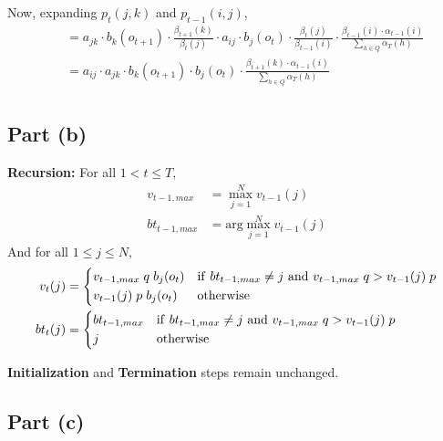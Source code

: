 \documentclass[11pt,a4paper,titlepage]{article}
\begin{document}
Now, expanding $p_t(j, k)$ and $p_{t-1}(i, j)$,
\begin{align*}
    ~~ &= a_{jk} \cdot b_k(o_{t+1}) \cdot \frac{\beta_{t+1}(k)}{\beta_t(j)} \cdot
          a_{ij} \cdot b_j(o_t) \cdot \frac{\beta_t(j)}{\beta_{t-1}(i)} \cdot
          \frac{\beta_{t-1}(i) \cdot \alpha_{t-1}(i)}{\sum_{h \in Q}\alpha_T(h)} \\
       &= a_{ij} \cdot a_{jk} \cdot b_k(o_{t+1}) \cdot b_j(o_t) \cdot
          \frac{\beta_{t+1}(k) \cdot \alpha_{t-1}(i)}{\sum_{h \in Q}\alpha_T(h)} \\
\end{align*}

\subsection*{Part (b)}

\textbf{Recursion:} For all $1 < t \le T$,
\begin{align*}
    v_{t-1, max} &= \max_{j=1}^N v_{t-1}(j) \\
    bt_{t-1, max} &= \textrm{arg}\max_{j=1}^N v_{t-1}(j) %
\end{align*}
And for all $1 \le j \le N$,
\begin{align*}
    v_t(j) &=
    \begin{dcases}
        v_{t-1, max} \; q \; b_j(o_t)
            & {\rm if~} bt_{t-1, max} \ne j {\rm~and~} v_{t-1, max} \; q > v_{t-1}(j) \; p \\
        v_{t-1}(j) \; p \; b_j(o_t)
            & \textrm{otherwise}
    \end{dcases} \\
    bt_t(j) &=
    \begin{dcases}
        bt_{t-1,max}
            & {\rm if~} bt_{t-1, max} \ne j {\rm~and~} v_{t-1, max} \; q > v_{t-1}(j) \; p \\
        j
            & \textrm{otherwise}
    \end{dcases}
\end{align*}

\noindent \textbf{Initialization} and \textbf{Termination} steps remain unchanged.

\subsection*{Part (c)}
\end{document}
